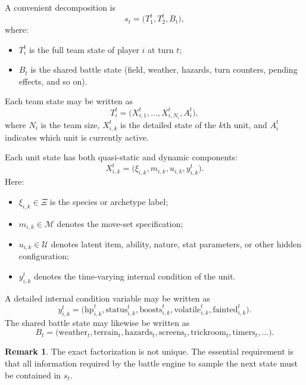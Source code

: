 \documentclass[aps,pre,twocolumn,superscriptaddress,nofootinbib]{revtex4-2}
\newcommand{\cM}{\mathcal{M}}
\newcommand{\cU}{\mathcal{U}}
\theoremstyle{definition}
\newtheorem{rmk}{Remark}
\theoremstyle{plain}
\begin{document}
A convenient decomposition is
\begin{equation}
    s_t = \big(T_1^t,T_2^t,B_t\big),
\end{equation}
where:
\begin{itemize}
    \item $T_i^t$ is the full team state of player $i$ at turn $t$;
    \item $B_t$ is the shared battle state (field, weather, hazards, turn counters, pending effects, and so on).
\end{itemize}

Each team state may be written as
\begin{equation}
    T_i^t = \big( X_{i,1}^t, \dots, X_{i,N_i}^t, A_i^t \big),
\end{equation}
where $N_i$ is the team size, $X_{i,k}^t$ is the detailed state of the $k$th unit, and $A_i^t$ indicates which unit is currently active.

Each unit state has both quasi-static and dynamic components:
\begin{equation}
    X_{i,k}^t = \big(\xi_{i,k}, m_{i,k}, u_{i,k}, y_{i,k}^t\big).
\end{equation}
Here:
\begin{itemize}
    \item $\xi_{i,k} \in \Xi$ is the species or archetype label;
    \item $m_{i,k} \in \cM$ denotes the move-set specification;
    \item $u_{i,k} \in \cU$ denotes latent item, ability, nature, stat parameters, or other hidden configuration;
    \item $y_{i,k}^t$ denotes the time-varying internal condition of the unit.
\end{itemize}

A detailed internal condition variable may be written as
\begin{equation}
    y_{i,k}^t = \big(\mathrm{hp}_{i,k}^t,\mathrm{status}_{i,k}^t,\mathrm{boosts}_{i,k}^t,\mathrm{volatile}_{i,k}^t,\mathrm{fainted}_{i,k}^t\big).
\end{equation}
The shared battle state may likewise be written as
\begin{equation}
    B_t = \big(\mathrm{weather}_t,\mathrm{terrain}_t,\mathrm{hazards}_t,\mathrm{screens}_t,\mathrm{trickroom}_t,\mathrm{timers}_t,\dots\big).
\end{equation}

\begin{rmk}
    The exact factorization is not unique. The essential requirement is that all information required by the battle engine to sample the next state must be contained in $s_t$.
\end{rmk}
\end{document}
